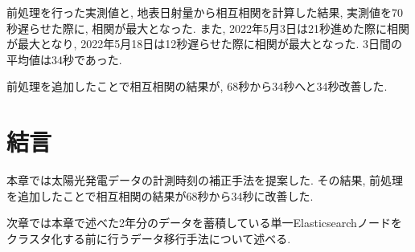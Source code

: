 前処理を行った実測値と, 地表日射量から相互相関を計算した結果, 実測値を70秒遅らせた際に, 相関が最大となった. また, 2022年5月3日は21秒進めた際に相関が最大となり, 2022年5月18日は12秒遅らせた際に相関が最大となった. 3日間の平均値は34秒であった.

前処理を追加したことで相互相関の結果が, 68秒から34秒へと34秒改善した.

\section{結言}
本章では太陽光発電データの計測時刻の補正手法を提案した. その結果, 前処理を追加したことで相互相関の結果が68秒から34秒に改善した.

次章では本章で述べた2年分のデータを蓄積している単一Elasticsearchノードをクラスタ化する前に行うデータ移行手法について述べる.